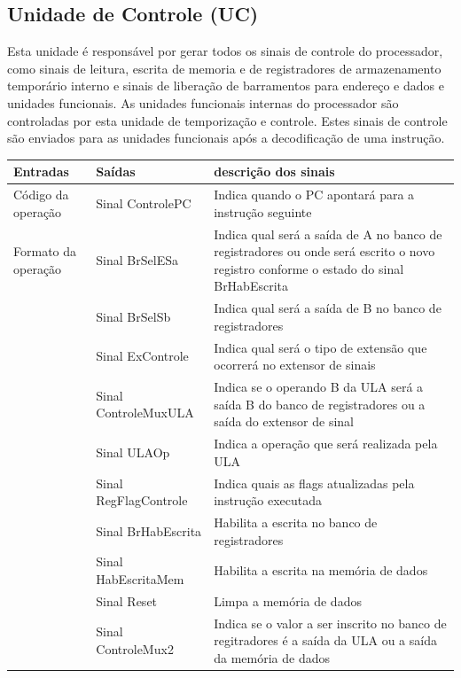 \documentclass{article}
\begin{document}
    \subsection{Unidade de Controle (UC)}
    Esta unidade é responsável por gerar todos os sinais de controle do processador, como  sinais  de  leitura,  escrita  de  memoria  e  de  registradores  de  armazenamento temporário  interno  e  sinais  de  liberação  de  barramentos  para  endereço  e  dados  e unidades  funcionais.  As  unidades  funcionais  internas  do  processador  são  controladas por esta unidade de temporização e controle. Estes sinais de controle são enviados para as unidades funcionais após a decodificação de uma instrução.
  \FloatBarrier
    \begin{table}[H]
      \begin{center}
        \begin{tabular}[pos]{|m{4cm} | m{4cm}| m{5cm}|} 
          \hline
          \cellcolor[gray]{0.9}\textbf{Entradas} & \cellcolor[gray]{0.9}\textbf{Saídas} & 
          \cellcolor[gray]{0.9}\textbf{descrição dos sinais}\\ \hline
            Código da operação & Sinal ControlePC & Indica quando o PC apontará para a instrução seguinte \\ \hline
            Formato da operação & Sinal BrSelESa & Indica qual será a saída de A no banco de registradores ou onde será escrito o novo registro conforme o estado do sinal BrHabEscrita\\ \hline
            & Sinal BrSelSb & Indica qual será a saída de B no banco de registradores \\ \hline
            & Sinal ExControle & Indica qual será o tipo de extensão que ocorrerá no extensor de sinais\\ \hline
            & Sinal ControleMuxULA & Indica se o operando B da ULA será a saída B do banco de registradores ou a saída do extensor de sinal \\ \hline
            & Sinal ULAOp & Indica a operação que será realizada pela ULA\\ \hline
            & Sinal RegFlagControle & Indica quais as flags atualizadas pela instrução executada\\ \hline
            & Sinal BrHabEscrita & Habilita a escrita no banco de registradores \\ \hline
            & Sinal HabEscritaMem & Habilita a escrita na memória de dados\\ \hline
            & Sinal Reset & Limpa a memória de dados \\ \hline
            & Sinal ControleMux2 & Indica se o valor a ser inscrito no banco de regitradores é a saída da ULA ou a saída da memória de dados  \\ \hline
        \end{tabular}
      \end{center}
    \end{table}  
    

% 
% 
\end{document}
